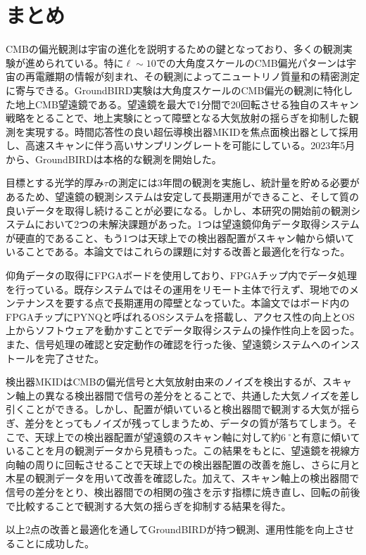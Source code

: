 \chapter{まとめ}
\label{chapter6}

CMBの偏光観測は宇宙の進化を説明するための鍵となっており、多くの観測実験が進められている。特に$\ell\sim 10$での大角度スケールのCMB偏光パターンは宇宙の再電離期の情報が刻まれ、その観測によってニュートリノ質量和の精密測定に寄与できる。GroundBIRD実験は大角度スケールのCMB偏光の観測に特化した地上CMB望遠鏡である。望遠鏡を最大で1分間で20回転させる独自のスキャン戦略をとることで、地上実験にとって障壁となる大気放射の揺らぎを抑制した観測を実現する。時間応答性の良い超伝導検出器MKIDを焦点面検出器として採用し、高速スキャンに伴う高いサンプリングレートを可能にしている。2023年5月から、GroundBIRDは本格的な観測を開始した。

目標とする光学的厚み$\tau$の測定には3年間の観測を実施し、統計量を貯める必要があるため、望遠鏡の観測システムは安定して長期運用ができること、そして質の良いデータを取得し続けることが必要になる。しかし、本研究の開始前の観測システムにおいて2つの未解決課題があった。1つは望遠鏡仰角データ取得システムが硬直的であること、もう1つは天球上での検出器配置がスキャン軸から傾いていることである。本論文ではこれらの課題に対する改善と最適化を行なった。

仰角データの取得にFPGAボードを使用しており、FPGAチップ内でデータ処理を行っている。既存システムではその運用をリモート主体で行えず、現地でのメンテナンスを要する点で長期運用の障壁となっていた。本論文ではボード内のFPGAチップにPYNQと呼ばれるOSシステムを搭載し、アクセス性の向上とOS上からソフトウェアを動かすことでデータ取得システムの操作性向上を図った。また、信号処理の確認と安定動作の確認を行った後、望遠鏡システムへのインストールを完了させた。

検出器MKIDはCMBの偏光信号と大気放射由来のノイズを検出するが、スキャン軸上の異なる検出器間で信号の差分をとることで、共通した大気ノイズを差し引くことができる。しかし、配置が傾いていると検出器間で観測する大気が揺らぎ、差分をとってもノイズが残ってしまうため、データの質が落ちてしまう。そこで、天球上での検出器配置が望遠鏡のスキャン軸に対して約$\SI{6}{^{\circ}}$と有意に傾いていることを月の観測データから見積もった。この結果をもとに、望遠鏡を視線方向軸の周りに回転させることで天球上での検出器配置の改善を施し、さらに月と木星の観測データを用いて改善を確認した。加えて、スキャン軸上の検出器間で信号の差分をとり、検出器間での相関の強さを示す指標に焼き直し、回転の前後で比較することで観測する大気の揺らぎを抑制する結果を得た。

以上2点の改善と最適化を通してGroundBIRDが持つ観測、運用性能を向上させることに成功した。
